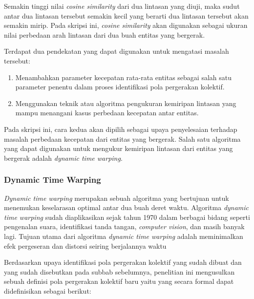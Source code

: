 Semakin tinggi nilai \textit{cosine similarity} dari dua lintasan yang diuji, maka sudut antar dua lintasan tersebut semakin kecil yang berarti dua lintasan tersebut akan semakin mirip. Pada skripsi ini, \textit{cosine similarity} akan digunakan sebagai ukuran nilai perbedaan arah lintasan dari dua buah entitas yang bergerak.




Terdapat dua pendekatan yang dapat digunakan untuk mengatasi masalah tersebut:

\begin{enumerate}
    \item Menambahkan parameter kecepatan rata-rata entitas sebagai salah satu parameter penentu dalam proses identifikasi pola pergerakan kolektif.
    \item Menggunakan teknik atau algoritma pengukuran kemiripan lintasan yang mampu menangani kasus perbedaan kecepatan antar entitas.
\end{enumerate}


 

Pada skripsi ini, cara kedua akan dipilih sebagai upaya penyelesaian terhadap masalah perbedaan kecepatan dari entitas yang bergerak. Salah satu algoritma yang dapat digunakan untuk mengukur kemiripan lintasan dari entitas yang bergerak adalah \textit{dynamic time warping}.

\subsubsection*{Dynamic Time Warping}

\textit{Dynamic time warping} merupakan sebuah algoritma yang bertujuan untuk menemukan keselarasan optimal antar dua buah deret waktu. Algoritma \textit{dynamic time warping} sudah diaplikasikan sejak tahun 1970 dalam berbagai bidang seperti pengenalan suara, identifikasi tanda tangan, \textit{computer vision}, dan masih banyak lagi. Tujuan utama dari algoritma \textit{dynamic time warping} adalah meminimalkan efek pergeseran dan distorsi seiring berjalannya waktu 



Berdasarkan upaya identifikasi pola pergerakan kolektif yang sudah dibuat dan  yang sudah disebutkan pada subbab sebelumnya, penelitian ini mengusulkan sebuah definisi pola pergerakan kolektif baru yaitu  yang secara formal dapat didefinisikan sebagai berikut:

\fi